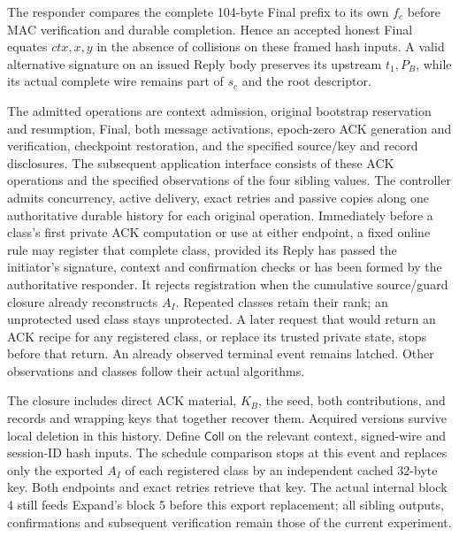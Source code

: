 The responder compares the complete 104-byte Final prefix to its own
$f_c$ before MAC verification and durable completion. Hence an accepted
honest Final equates $\mathit{ctx},x,y$ in the absence of collisions
on these framed hash inputs. A valid alternative signature on an issued
Reply body preserves its upstream $t_1,P_B$, while its actual complete
wire remains part of $s_c$ and the root descriptor.

\begin{definition}
\label{def:bootstrap-online}
The admitted operations are context admission, original bootstrap
reservation and resumption, Final, both message activations, epoch-zero
ACK generation and verification, checkpoint restoration, and the
specified source/key and record disclosures. The subsequent application
interface consists of these ACK operations and the specified observations
of the four sibling values. The controller admits concurrency, active
delivery, exact retries and passive copies along one authoritative
durable history for each original operation. Immediately before a class's
first private ACK computation or use at either endpoint, a fixed online rule
may register that complete class, provided its Reply has passed the
initiator's signature, context and confirmation checks or has been formed
by the authoritative responder. It rejects registration when the
cumulative source/guard closure already reconstructs $A_I$. Repeated
classes retain their rank; an unprotected used class stays unprotected.
A later request that would return an ACK recipe for any registered class,
or replace its trusted private state, stops before that return. An already
observed terminal event remains latched. Other observations and classes
follow their actual algorithms.
\end{definition}

The closure includes direct ACK material, $K_B$, the seed, both
contributions, and records and wrapping keys that together recover them.
Acquired versions survive local deletion in this history. Define
$\mathsf{Coll}$ on the relevant context, signed-wire and session-ID
hash inputs. The schedule comparison stops at this event and replaces
only the exported $A_I$ of each registered class by an independent cached
32-byte key. Both endpoints and exact retries retrieve that key.
The actual internal block 4 still feeds Expand's block 5 before this
export replacement; all sibling outputs, confirmations and subsequent
verification remain those of the current experiment.

